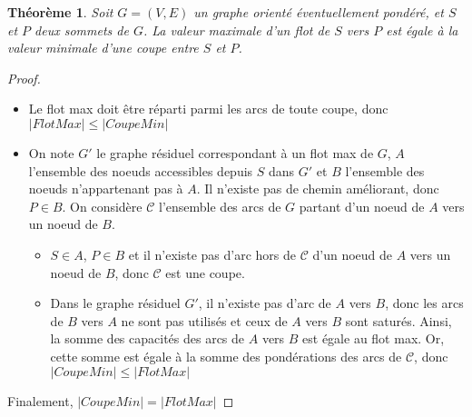\documentclass[11pt,a4paper]{article}
\newtheorem{theorem}{Théorème}[section] %
\begin{document}
\begin{theorem}
Soit \(G=(V,E)\) un graphe orienté éventuellement pondéré, et \(S\) et \(P\) deux sommets de \(G\). La valeur maximale d'un flot de \(S\) vers \(P\) est égale à la valeur minimale d'une coupe entre \(S\) et \(P\).
\end{theorem}
\begin{proof}\leavevmode
  \begin{itemize}
    \item Le flot max doit être réparti parmi les arcs de toute coupe, donc \( \left| FlotMax \right| \leq \left| CoupeMin \right| \)
    \item On note \(G'\) le graphe résiduel correspondant à un flot max de \(G\), \(A\) l'ensemble des noeuds accessibles depuis \(S\) dans \(G'\) et \(B\) l'ensemble des noeuds n'appartenant pas à \(A\). Il n'existe pas de chemin améliorant, donc \(P \in B\). On considère \(\mathcal{C}\) l'ensemble des arcs de \(G\) partant d'un noeud de \(A\) vers un noeud de \(B\).
    \begin{itemize}
        \item \(S \in A\), \(P \in B\) et il n'existe pas d'arc hors de \(\mathcal{C}\) d'un noeud de \(A\) vers un noeud de \(B\), donc \(\mathcal{C}\) est une coupe.
        \item Dans le graphe résiduel \(G'\), il n'existe pas d'arc de \(A\) vers \(B\), donc les arcs de \(B\) vers \(A\) ne sont pas utilisés et ceux de \(A\) vers \(B\) sont saturés. Ainsi, la somme des capacités des arcs de \(A\) vers \(B\) est égale au flot max. Or, cette somme est égale à la somme des pondérations des arcs de \(\mathcal{C}\), donc \( \left| CoupeMin \right| \leq \left| FlotMax \right| \)
    \end{itemize}
  \end{itemize}
  Finalement, \( \left| CoupeMin \right| = \left| FlotMax \right| \)
\end{proof}
\end{document}

